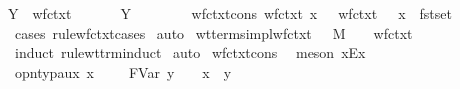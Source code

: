 \begin{isabellebody}
Y{\isacharcolon}\ {\isachardoublequoteopen}{\isasymlbrakk}\ wf{\isacharunderscore}ctxt\ {\isasymGamma}\ {\isasymrbrakk}\ {\isasymLongrightarrow}\ \ {\isasymGamma}\ {\isasymturnstile}\ Y\ {\isasymsigma}\ {\isacharcolon}\ {\isacharparenleft}{\isasymsigma}\ {\isasymrightarrow}\ {\isasymsigma}{\isacharparenright}\ {\isasymrightarrow}\ {\isasymsigma}{\isachardoublequoteclose}\isanewline
\isanewline
{}\isamarkupfalse%
\ wf{\isacharunderscore}ctxt{\isacharunderscore}cons{\isacharcolon}\ {\isachardoublequoteopen}wf{\isacharunderscore}ctxt\ {\isacharparenleft}{\isacharparenleft}x{\isacharcomma}\ {\isasymsigma}{\isacharparenright}{\isacharhash}{\isasymGamma}{\isacharparenright}\ {\isasymLongrightarrow}\ wf{\isacharunderscore}ctxt\ {\isasymGamma}\ {\isasymand}\ x\ {\isasymnotin}\ fst{\isacharbackquote}set\ {\isasymGamma}{\isachardoublequoteclose}\isanewline
%
\isadelimproof
%
\endisadelimproof
%
\isatagproof
{}\isamarkupfalse%
\ {\isacharparenleft}cases\ rule{\isacharcolon}wf{\isacharunderscore}ctxt{\isachardot}cases{\isacharparenright}\isanewline
{}\isamarkupfalse%
\ auto%
\endisatagproof
{\isafoldproof}%
%
\isadelimproof
\isanewline
%
\endisadelimproof
\isanewline
{}\isamarkupfalse%
\ wt{\isacharunderscore}terms{\isacharunderscore}impl{\isacharunderscore}wf{\isacharunderscore}ctxt{\isacharcolon}\ {\isachardoublequoteopen}{\isasymGamma}\ {\isasymturnstile}\ M\ {\isacharcolon}\ {\isasymsigma}\ {\isasymLongrightarrow}\ wf{\isacharunderscore}ctxt\ {\isasymGamma}{\isachardoublequoteclose}\isanewline
%
\isadelimproof
%
\endisadelimproof
%
\isatagproof
{}\isamarkupfalse%
\ {\isacharparenleft}induct\ rule{\isacharcolon}wt{\isacharunderscore}trm{\isachardot}induct{\isacharparenright}\isanewline
{}\isamarkupfalse%
\ auto\isanewline
{}\isamarkupfalse%
\ wf{\isacharunderscore}ctxt{\isacharunderscore}cons\ \isamarkupfalse%
\ {\isacharparenleft}meson\ x{\isacharunderscore}Ex{\isacharparenright}%
\endisatagproof
{\isafoldproof}%
%
\isadelimproof
\isanewline
%
\endisadelimproof
\isanewline
{}\isamarkupfalse%
\ opn{\isacharunderscore}typ{\isacharunderscore}aux{\isacharcolon}\ {\isachardoublequoteopen}{\isacharparenleft}x{\isacharcomma}\ {\isasymtau}{\isacharparenright}\ {\isacharhash}\ {\isasymGamma}\ {\isasymturnstile}\ FVar\ y\ {\isacharcolon}\ {\isasymsigma}\ {\isasymLongrightarrow}\ x\ {\isacharequal}\ y\ {\isasymLongrightarrow}\ {\isasymtau}\ {\isacharequal}\ {\isasymsigma}{\isachardoublequoteclose}\isanewline
%
\isadelimproof
%
\endisadelimproof

\end{isabellebody}
